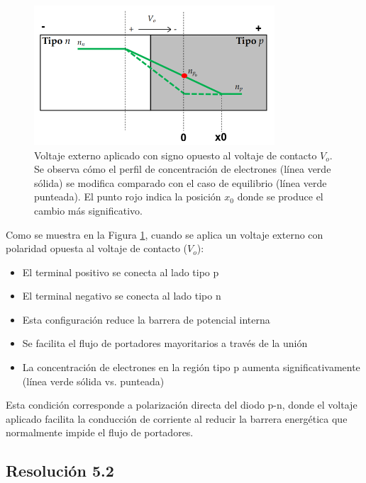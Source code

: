 \documentclass[
  11pt,
  letterpaper,
   addpoints,
  ]{exam}
\begin{document}
\begin{questions}
\begin{solution}
    \begin{figure}[H]
        \centering
        \includegraphics[width=0.8\textwidth]{../figures/Auxiliar_2_11}
        \caption{Voltaje externo aplicado con signo opuesto al voltaje de contacto $V_o$. Se observa cómo el perfil de concentración de electrones (línea verde sólida) se modifica comparado con el caso de equilibrio (línea verde punteada). El punto rojo indica la posición $x_0$ donde se produce el cambio más significativo.}
        \label{fig:voltaje_externo}
    \end{figure}

    Como se muestra en la Figura \ref{fig:voltaje_externo}, cuando se aplica un voltaje externo con polaridad opuesta al voltaje de contacto ($V_o$):

    \begin{itemize}
        \item El terminal positivo se conecta al lado tipo p
        \item El terminal negativo se conecta al lado tipo n
        \item Esta configuración reduce la barrera de potencial interna
        \item Se facilita el flujo de portadores mayoritarios a través de la unión
        \item La concentración de electrones en la región tipo p aumenta significativamente (línea verde sólida vs. punteada)
    \end{itemize}

    Esta condición corresponde a polarización directa del diodo p-n, donde el voltaje aplicado facilita la conducción de corriente al reducir la barrera energética que normalmente impide el flujo de portadores.

    \subsection*{Resolución 5.2}
    

\end{solution}
\end{questions}
\end{document}
